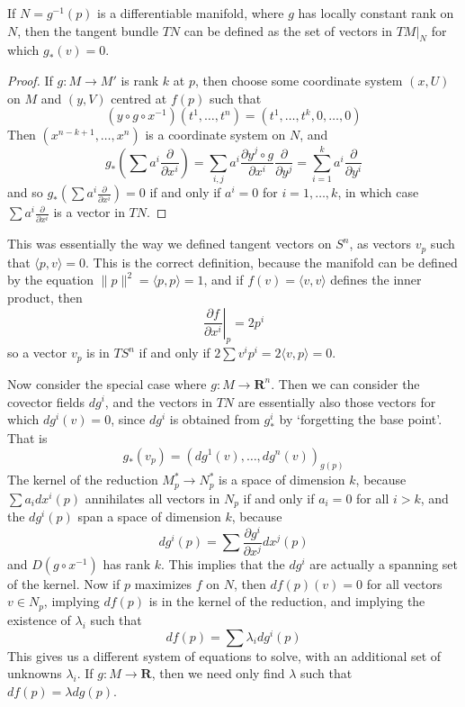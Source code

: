\begin{theorem}
    If $N = g^{-1}(p)$ is a differentiable manifold, where $g$ has locally constant rank on $N$, then the tangent bundle $TN$ can be defined as the set of vectors in $TM|_N$ for which $g_*(v) = 0$.
\end{theorem}
\begin{proof}
    If $g: M \to M'$ is rank $k$ at $p$, then choose some coordinate system $(x,U)$ on $M$ and $(y,V)$ centred at $f(p)$ such that
    \[ (y \circ g \circ x^{-1})(t^1, \dots, t^n) = (t^1, \dots, t^k, 0, \dots, 0) \]
    Then $(x^{n-k+1}, \dots, x^n)$ is a coordinate system on $N$, and
    \[ g_* \left( \sum a^i \frac{\partial}{\partial x^i} \right) = \sum_{i,j} a^i \frac{\partial y^j \circ g}{\partial x^i} \frac{\partial}{\partial y^j} = \sum_{i = 1}^k a^i \frac{\partial}{\partial y^i} \]
    and so $g_* \left(\sum a^i \frac{\partial}{\partial x^i} \right) = 0$ if and only if $a^i = 0$ for $i = 1, \dots, k$, in which case $\sum a^i \frac{\partial}{\partial x^i}$ is a vector in $TN$.
\end{proof}

\begin{example}
This was essentially the way we defined tangent vectors on $S^n$, as vectors $v_p$ such that $\langle p, v \rangle = 0$. This is the correct definition, because the manifold can be defined by the equation $\| p \|^2 = \langle p, p \rangle = 1$, and if $f(v) = \langle v, v \rangle$ defines the inner product, then
%
\[ \left. \frac{\partial f}{\partial x^i} \right|_p = 2p^i \]
%
so a vector $v_p$ is in $TS^n$ if and only if $2 \sum v^i p^i = 2 \langle v, p \rangle = 0$.
\end{example}

Now consider the special case where $g: M \to \mathbf{R}^n$. Then we can consider the covector fields $dg^i$, and the vectors in $TN$ are essentially also those vectors for which $dg^i(v) = 0$, since $dg^i$ is obtained from $g^i_*$ by `forgetting the base point'. That is
%
\[ g_*(v_p) = (dg^1(v), \dots, dg^n(v))_{g(p)} \]
%
The kernel of the reduction $M^*_p \to N^*_p$ is a space of dimension $k$, because $\sum a_i dx^i(p)$ annihilates all vectors in $N_p$ if and only if $a_i = 0$ for all $i > k$, and the $dg^i(p)$ span a space of dimension $k$, because
%
\[ dg^i(p) = \sum \frac{\partial g^i}{\partial x^j} dx^j(p) \]
%
and $D(g \circ x^{-1})$ has rank $k$. This implies that the $dg^i$ are actually a spanning set of the kernel. Now if $p$ maximizes $f$ on $N$, then $df(p)(v) = 0$ for all vectors $v \in N_p$, implying $df(p)$ is in the kernel of the reduction, and implying the existence of $\lambda_i$ such that
%
\[ df(p) = \sum \lambda_i dg^i(p) \]
%
This gives us a different system of equations to solve, with an additional set of unknowns $\lambda_i$. If $g: M \to \mathbf{R}$, then we need only find $\lambda$ such that $df(p) = \lambda dg(p)$.

